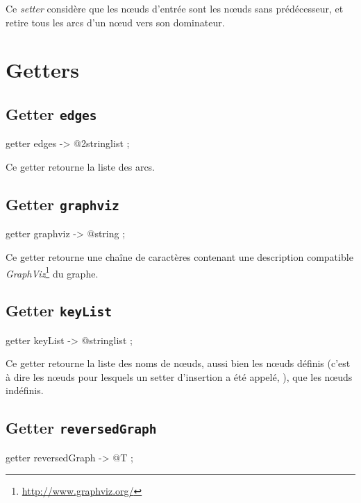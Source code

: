 Ce \emph{setter} considère que les nœuds d'entrée sont les nœuds sans prédécesseur, et retire tous les arcs d'un nœud vers son dominateur.

\section{Getters}

\subsection{Getter \texttt{edges}}

\begin{galgascode}
getter edges -> @2stringlist ;
\end{galgascode}

Ce getter retourne la liste des arcs.


\subsection{Getter \texttt{graphviz}}

\begin{galgascode}
getter graphviz -> @string ;
\end{galgascode}

Ce getter retourne une chaîne de caractères contenant une description compatible \emph{GraphViz}\footnote{\url{http://www.graphviz.org/}} du graphe.


\subsection{Getter \texttt{keyList}}

\begin{galgascode}
getter keyList -> @stringlist ;
\end{galgascode}

Ce getter retourne la liste des noms de nœuds, aussi bien les nœuds définis (c'est à dire les nœuds pour lesquels un setter d'insertion a été appelé, ), que les nœuds indéfinis.



\subsection{Getter \texttt{reversedGraph}}

\begin{galgascode}
getter reversedGraph -> @T ;
\end{galgascode}

